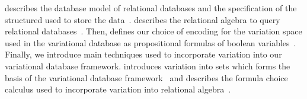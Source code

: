 %
 describes the database model of relational databases and the specification of
the structured used to store the data~\cite{AliceBook}. 
 describes the relational algebra to query relational databases~\cite{AliceBook}.
%
Then, 
 defines our choice of encoding for the variation space used in the 
variational database as propositional formulas of boolean variables~\cite{ATW18poly,ATW17dbpl}.
%
Finally, we introduce main techniques used to incorporate variation into our variational 
database framework.
 introduces variation into sets which forms the basis of the variational database
framework~\cite{EWC13fosd,Walk14onward,ATW17dbpl} 
and  describes the formula choice calculus used to incorporate 
variation into relational algebra~\cite{HW16fosd}.



%




